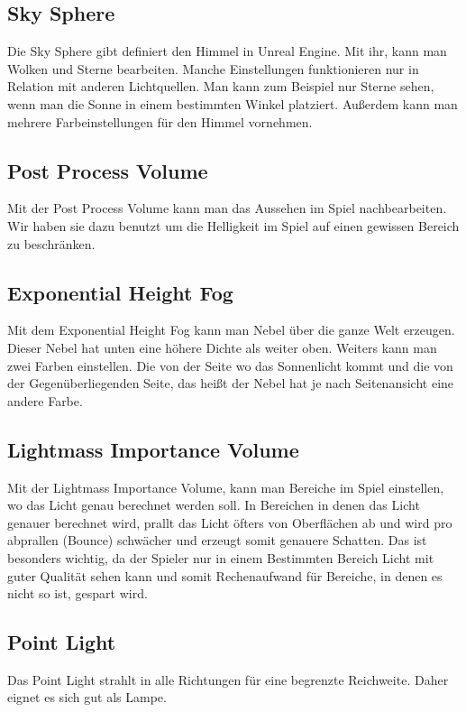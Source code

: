 \subsection{Sky Sphere}
Die Sky Sphere gibt definiert den Himmel in Unreal Engine. Mit ihr, kann man Wolken und Sterne bearbeiten. Manche Einstellungen funktionieren nur in Relation mit anderen
Lichtquellen. Man kann zum Beispiel nur Sterne sehen, wenn man die Sonne in einem bestimmten Winkel platziert.
Außerdem kann man mehrere Farbeinstellungen für den Himmel vornehmen.

\subsection{Post Process Volume}
Mit der Post Process Volume kann man das Aussehen im Spiel nachbearbeiten. \citep{unreal:postProcessVolume} Wir haben sie dazu benutzt um die Helligkeit im Spiel auf einen gewissen Bereich zu beschränken.

\subsection{Exponential Height Fog}
Mit dem Exponential Height Fog kann man Nebel über die ganze Welt erzeugen. Dieser Nebel hat unten eine höhere Dichte als weiter oben. Weiters kann man zwei Farben einstellen.
Die von der Seite wo das Sonnenlicht kommt und die von der Gegenüberliegenden Seite, das heißt der Nebel hat je nach Seitenansicht eine andere Farbe. \citep{unreal:exponentialHeightFog}

\subsection{Lightmass Importance Volume}
Mit der Lightmass Importance Volume, kann man Bereiche im Spiel einstellen, wo das Licht genau berechnet werden soll. In Bereichen in denen das
Licht genauer berechnet wird, prallt das Licht öfters von Oberflächen ab und wird pro abprallen (Bounce) schwächer und erzeugt somit genauere Schatten.
Das ist besonders wichtig, da der Spieler nur in einem Bestimmten Bereich Licht mit guter Qualität sehen kann und somit Rechenaufwand für Bereiche,
in denen es nicht so ist, gespart wird. \citep{unreal:lightmassImportanceVolume}

\subsection{Point Light}
Das Point Light strahlt in alle Richtungen für eine begrenzte Reichweite. Daher eignet es sich gut als Lampe.

